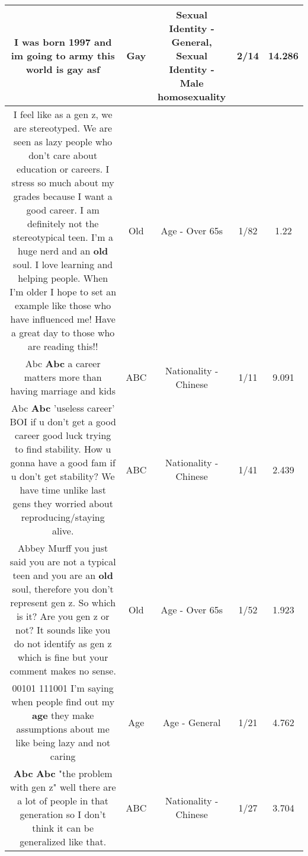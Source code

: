 \documentclass[11pt]{article}
\newlength\mylength
\begin{document}
\begin{center}
\begin{longtable}{|C{.65\mylength}|C{.30\mylength}|C{.12\mylength}|C{.12\mylength}|C{.12\mylength}|}
  \small I was born 1997 and im going to army this world is \textbf{g\textbf{ay}} asf\normalsize   & Gay & Sexual Identity - General, Sexual Identity - Male homosexuality & 2/14 & 14.286 \\  \hline
  \small I feel like as a gen z, we are stereotyped. We are seen as lazy people who don't care about education or careers. I stress so much about my grades because I want a good career. I am definitely not the stereotypical teen. I'm a huge nerd and an \textbf{old} soul. I love learning and helping people. When I'm older I hope to set an example like those who have influenced me!  Have a great day to those who are reading this!!\normalsize   & Old & Age - Over 65s & 1/82 & 1.22 \\  \hline
  \small Abc \textbf{Abc} a career matters more than having marriage and kids\normalsize   & ABC & Nationality - Chinese & 1/11 & 9.091 \\  \hline
  \small Abc \textbf{Abc} 'useless career' BOI if u don't get a good career good luck trying to find stability. How u gonna have a good fam if u don't get stability? We have time unlike last gens they worried about reproducing/staying alive.\normalsize   & ABC & Nationality - Chinese & 1/41 & 2.439 \\  \hline
  \small Abbey Murff you just said you are not a typical teen and you are an \textbf{old} soul, therefore you don't represent gen z. So which is it? Are you gen z or not? It sounds like you do not identify as gen z which is fine but your comment makes no sense.\normalsize   & Old & Age - Over 65s & 1/52 & 1.923 \\  \hline
  \small 00101 111001 I'm saying when people find out my \textbf{age} they make assumptions about me like being lazy and not caring\normalsize   & Age & Age - General & 1/21 & 4.762 \\  \hline
  \small \@\textbf{Abc} \textbf{Abc} "the problem with gen z" well there are a lot of people in that generation so I don't think it can be generalized like that.\normalsize   & ABC & Nationality - Chinese & 1/27 & 3.704 \\  \hline

\end{longtable}
\end{center}
\end{document}
